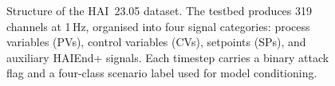 \begin{figure}[H]
\caption{Structure of the HAI~23.05 dataset. The testbed produces 319 channels
at 1\,Hz, organised into four signal categories: process variables (PVs),
control variables (CVs), setpoints (SPs), and auxiliary HAIEnd+ signals.
Each timestep carries a binary attack flag and a four-class scenario label
used for model conditioning.}
\label{fig:dataset_structure}
\end{figure}
